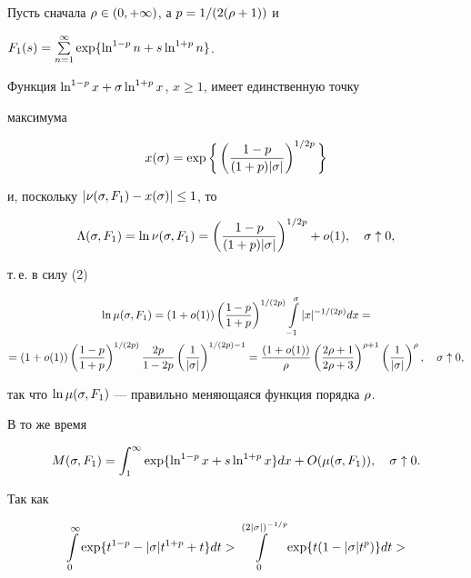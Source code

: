 \begin{pf}


Пусть сначала $\rho\in(0,+\infty)$, а $p=1/(2(\rho+1))$ и


$F_1(s)=\sum\limits_{n=1}^{\infty}\exp\{\ln^{1-p} n+s\ln^{1+p} n\}$.


Функция $\ln^{1-p} x+\sigma\ln^{1+p} x$, $x\ge1$, имеет единственную точку


максимума 


$$


x(\s)=\exp\bigg\{\left(\dfrac{1-p}{(1+p)|\s|}\right)^{1/2p}\bigg\}


$$


и, поскольку $|\nu(\sigma,F_1)-x(\sigma)|\le 1$, то 


$$


\L(\s,F_1)=\ln \nu(\s,F_1)=


\left(\dfrac{1-p}{(1+p)|\s|}\right)^{1/2p}+o(1),\quad \s\uparrow 0,


$$


т.\,е. в силу (2)


\begin{multline*}


\ln \mu(\s,F_1)=(1+o(1))\left(\dfrac{1-p}{1+p}\right)^{1/(2p)}


\int\limits_{-1}^{\s}|x|^{-1/(2p)}dx=\\


=(1+o(1))\left(\dfrac{1-p}{1+p}\right)^{1/(2p)}\dfrac{2p}{1-2p}


\left(\dfrac{1}{|\s|}\right)^{1/(2p)-1}=


\dfrac{(1+o(1))}{\r}\left(\dfrac{2\r+1}{2\r+3}\right)^{\r+1}


\left(\dfrac{1}{|\s|}\right)^{\r},\quad \s\uparrow 0,


\end{multline*}


так что $\ln \mu(\sigma,F_1)$ --- правильно меняющаяся функция порядка $\rho$.


В то же время


$$


M(\s,F_1)= \int_{1}^{\i}\exp\{\ln^{1-p} x+s\ln^{1+p} x\}dx+


O(\mu(\s,F_1)),\quad \s\uparrow 0.


$$


Так как


\begin{multline*}


\int\limits_{0}^{\i}\exp\{t^{1-p}-|\s|t^{1+p}+t\}dt>


\int\limits_{0}^{(2|\s|)^{-1/p}}\exp\{t(1-|\s|t^p)\}dt>\\



\end{multline*}
\end{pf}
